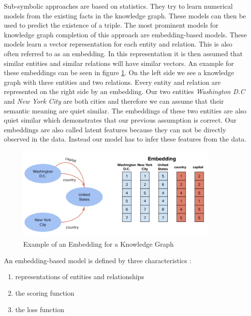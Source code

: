 Sub-symbolic approaches are based on statistics. They try to learn numerical models from the existing facts in the knowledge graph. These models can then be used to predict the existence of a triple.  \cite{nickel_review_2015} The most prominent models for knowledge graph completion of this approach are embedding-based models. These models learn a vector representation for each entity and relation. This is also often referred to as an embedding. In this representation it is then assumed that similar entities and similar relations will have similar vectors. An example for these embeddings can be seen in figure \ref{fig:embedding_example}. On the left side we see a knowledge graph with three entities and two relations. Every entity and relation are represented on the right side by an embedding. Our two entities \textit{Washington D.C} and \textit{New York City} are both cities and therefore we can assume that their semantic meaning are quiet similar. The embeddings of these two entities are also quiet similar which demonstrates that our previous assumption is correct. \cite{bianchi_knowledge_2020} Our embeddings are also called latent features because they can not be directly observed in the data. Instead our model has to infer these features from the data. \cite{nickel_review_2015} 

\begin{figure}[H]
\centering
\includegraphics[width=0.9\textwidth]{images/embedding_example.png}
\caption{Example of an Embedding for a Knowledge Graph}
\label{fig:embedding_example}
\end{figure}

An embedding-based model is defined by three characteristics \cite{bianchi_knowledge_2020}:

\begin{enumerate}
\item representations of entities and relationships
\item the scoring function
\item the loss function
\end{enumerate}

